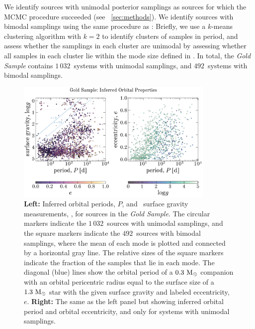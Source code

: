 \documentclass[modern]{aastex63}
\newcommand{\ngold}{\ensuremath{1\,032}}
\newcommand{\nbimodal}{\ensuremath{492}}
\begin{document}
We identify sources with unimodal posterior samplings as sources for which the
MCMC procedure succeeded (see \sectionname~\ref{sec:methods}).
We identify sources with bimodal samplings using the same procedure as
\cite{Price-Whelan:2018}: Briefly, we use a $k$-means clustering algorithm with
$k=2$ to identify clusters of samples in period, and assess whether the
samplings in each cluster are unimodal by assessing whether all samples in each
cluster lie within the mode size defined in \cite{thejoker}.
In total, the \textit{Gold Sample} contains \ngold\ systems with unimodal
samplings, and \nbimodal\ systems with bimodal samplings.

\begin{figure}[!t]
    \begin{center}
    \includegraphics[width=0.85\textwidth]{Plogg_Pe.pdf}
    \end{center}
    \caption{%
    \textbf{Left:} Inferred orbital periods, $P$, and \apogee\ surface gravity
    measurements, \logg, for sources in the \textit{Gold Sample}.
    The circular markers indicate the \ngold\ sources with unimodal samplings,
    and the square markers indicate the \nbimodal\ sources with bimodal
    samplings, where the mean of each mode is plotted and connected by a
    horizontal gray line.
    The relative sizes of the square markers indicate the fraction of the
    samples that lie in each mode.
    The diagonal (blue) lines show the orbital period of a $0.3~\mathrm{M}_\odot$ companion
    with an orbital pericentric radius equal to the surface size of a
    $1.3~\mathrm{M}_\odot$ star with the given surface gravity and labeled eccentricity,
    $e$.
    \textbf{Right:} The same as the left panel but showing inferred orbital
    period and orbital eccentricity, and only for systems with unimodal
    samplings.
    \label{fig:Plogg}
    }
\end{figure}
\end{document}
